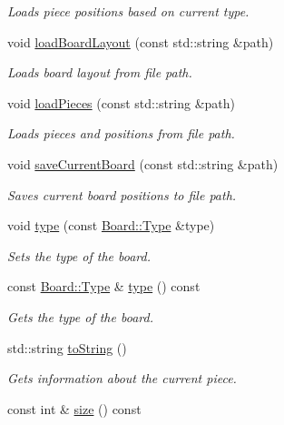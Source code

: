 \begin{DoxyCompactItemize}
\begin{DoxyCompactList}\small\item\em Loads piece positions based on current type. \end{DoxyCompactList}\item 
void \hyperlink{class_board_a4d1af50b46e324d36a48adf7ca92f650}{load\-Board\-Layout} (const std\-::string \&path)
\begin{DoxyCompactList}\small\item\em Loads board layout from file path. \end{DoxyCompactList}\item 
void \hyperlink{class_board_a496a9f70f5d4b006f91121cccacdd340}{load\-Pieces} (const std\-::string \&path)
\begin{DoxyCompactList}\small\item\em Loads pieces and positions from file path. \end{DoxyCompactList}\item 
void \hyperlink{class_board_a3b6aaed9aedbe55cbdfe08db472f2656}{save\-Current\-Board} (const std\-::string \&path)
\begin{DoxyCompactList}\small\item\em Saves current board positions to file path. \end{DoxyCompactList}\item 
void \hyperlink{class_board_a05a3dd8f1f000e20e743e894163228ec}{type} (const \hyperlink{class_board_a7a90fdd0f301fc502684108416605644}{Board\-::\-Type} \&type)
\begin{DoxyCompactList}\small\item\em Sets the type of the board. \end{DoxyCompactList}\item 
const \hyperlink{class_board_a7a90fdd0f301fc502684108416605644}{Board\-::\-Type} \& \hyperlink{class_board_ab2574abe1bfa632795d2b35ba1acb2e4}{type} () const 
\begin{DoxyCompactList}\small\item\em Gets the type of the board. \end{DoxyCompactList}\item 
std\-::string \hyperlink{class_board_a2cf2b2f6adc453bc3b086c9f10c77e11}{to\-String} ()
\begin{DoxyCompactList}\small\item\em Gets information about the current piece. \end{DoxyCompactList}\item 
\hypertarget{class_board_a84aaf6583d8b174ef864dc774979b1a2}{const int \& \hyperlink{class_board_a84aaf6583d8b174ef864dc774979b1a2}{size} () const }\label{class_board_a84aaf6583d8b174ef864dc774979b1a2}


\end{DoxyCompactItemize}
